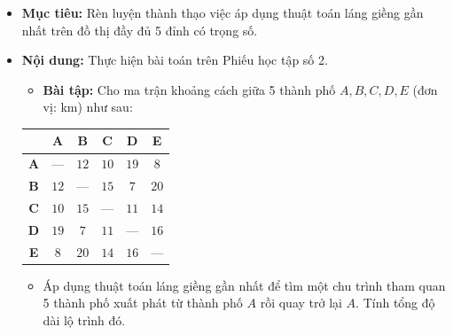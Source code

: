\documentclass[12pt, a4paper]{article}
\begin{document}
\begin{itemize}[leftmargin=1.2cm]
    \item[a)] \textbf{Mục tiêu:} Rèn luyện thành thạo việc áp dụng thuật toán láng giềng gần nhất trên đồ thị đầy đủ 5 đỉnh có trọng số.
    \item[b)] \textbf{Nội dung:} Thực hiện bài toán trên Phiếu học tập số 2.
    \begin{itemize}[leftmargin=0.6cm]
        \item \textbf{Bài tập:} Cho ma trận khoảng cách giữa 5 thành phố $A, B, C, D, E$ (đơn vị: km) như sau:
    \end{itemize}

    \begin{center}
    \begin{tabular}{|c|c|c|c|c|c|}
    \hline
     & \textbf{A} & \textbf{B} & \textbf{C} & \textbf{D} & \textbf{E} \\ \hline
    \textbf{A} & --- & $12$ & $10$ & $19$ & $8$ \\ \hline
    \textbf{B} & $12$ & --- & $15$ & $7$ & $20$ \\ \hline
    \textbf{C} & $10$ & $15$ & --- & $11$ & $14$ \\ \hline
    \textbf{D} & $19$ & $7$ & $11$ & --- & $16$ \\ \hline
    \textbf{E} & $8$ & $20$ & $14$ & $16$ & --- \\ \hline
    \end{tabular}
    \end{center}

    \begin{itemize}[leftmargin=0.6cm]
        \item Áp dụng thuật toán láng giềng gần nhất để tìm một chu trình tham quan 5 thành phố xuất phát từ thành phố $A$ rồi quay trở lại $A$. Tính tổng độ dài lộ trình đó.
    \end{itemize}


\end{itemize}
\end{document}

